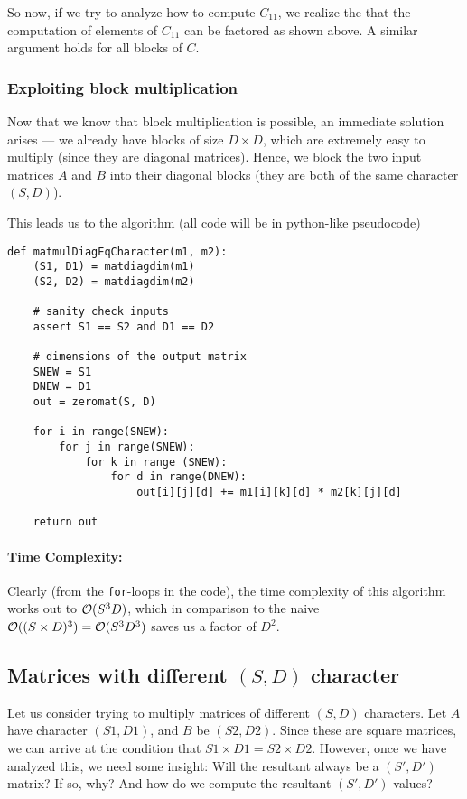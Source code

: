 \documentclass[11pt]{article}
\begin{document}
So now, if we try to analyze how to compute $C_{11}$, we realize the that
the computation of elements of $C_{11}$ can be factored as shown above. A
similar argument holds for all blocks of $C$.

\subsubsection{Exploiting block multiplication}

Now that we know that block multiplication is possible, an immediate solution
arises --- we already have blocks of size $D \times D$, which are extremely
easy to multiply (since they are diagonal matrices). Hence, we block the two
input matrices $A$ and $B$ into their diagonal blocks (they are both of the
same character $(S, D)$).

This leads us to the algorithm (all code will be in python-like pseudocode)
\newpage
\begin{verbatim}
def matmulDiagEqCharacter(m1, m2):
    (S1, D1) = matdiagdim(m1)
    (S2, D2) = matdiagdim(m2)

    # sanity check inputs
    assert S1 == S2 and D1 == D2

    # dimensions of the output matrix
    SNEW = S1
    DNEW = D1
    out = zeromat(S, D)

    for i in range(SNEW):
        for j in range(SNEW):
            for k in range (SNEW):
                for d in range(DNEW):
                    out[i][j][d] += m1[i][k][d] * m2[k][j][d]

    return out
\end{verbatim}

\paragraph{\textbf{Time Complexity:}}
Clearly (from the \texttt{for}-loops in the code), the time complexity of this
algorithm works out to $\mathcal{O}(S^3D)$, which in comparison to the naive
$\mathcal{O}((S \times D)^3) = \mathcal{O}(S^3 D^3)$ saves us a factor of $D^2$.

\subsection{Matrices with different $(S, D)$ character}
Let us consider trying to multiply matrices of different $(S, D)$ characters.
Let $A$ have character $(S1, D1)$, and $B$ be $(S2, D2)$. Since these
are square matrices, we can arrive at the condition that $S1 \times D1 = S2
\times D2$.
However, once we have analyzed this, we need some insight: Will the resultant
always be a $(S', D')$ matrix? If so, why? And how do we compute the resultant
$(S', D')$ values?
\end{document}
